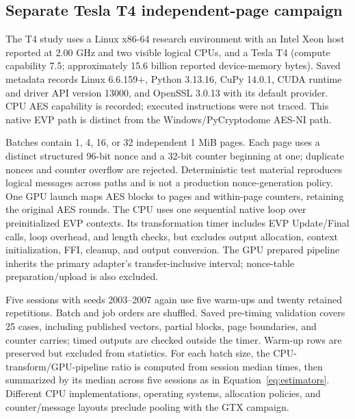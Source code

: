 \documentclass[11pt,a4paper]{article}
\begin{document}
\subsection{Separate Tesla T4 independent-page campaign}
The T4 study uses a Linux x86-64 research environment with an Intel Xeon host reported at 2.00 GHz and two visible logical CPUs, and a Tesla T4 (compute capability 7.5; approximately 15.6 billion reported device-memory bytes). Saved metadata records Linux 6.6.159+, Python 3.13.16, CuPy 14.0.1, CUDA runtime and driver API version 13000, and OpenSSL 3.0.13 with its default provider. CPU AES capability is recorded; executed instructions were not traced. This native EVP path is distinct from the Windows/PyCryptodome AES-NI path.

Batches contain 1, 4, 16, or 32 independent 1 MiB pages. Each page uses a distinct structured 96-bit nonce and a 32-bit counter beginning at one; duplicate nonces and counter overflow are rejected. Deterministic test material reproduces logical messages across paths and is not a production nonce-generation policy. One GPU launch maps AES blocks to pages and within-page counters, retaining the original AES rounds. The CPU uses one sequential native loop over preinitialized EVP contexts. Its transformation timer includes EVP Update/Final calls, loop overhead, and length checks, but excludes output allocation, context initialization, FFI, cleanup, and output conversion. The GPU prepared pipeline inherits the primary adapter's transfer-inclusive interval; nonce-table preparation/upload is also excluded.

Five sessions with seeds 2003--2007 again use five warm-ups and twenty retained repetitions. Batch and job orders are shuffled. Saved pre-timing validation covers 25 cases, including published vectors, partial blocks, page boundaries, and counter carries; timed outputs are checked outside the timer. Warm-up rows are preserved but excluded from statistics. For each batch size, the CPU-transform/GPU-pipeline ratio is computed from session median times, then summarized by its median across five sessions as in Equation~\eqref{eq:estimators}. Different CPU implementations, operating systems, allocation policies, and counter/message layouts preclude pooling with the GTX campaign.
\end{document}
